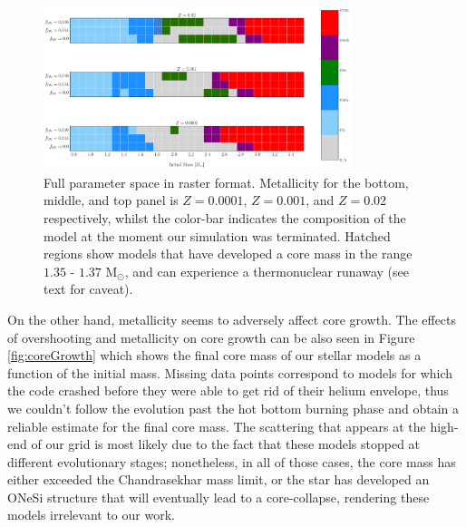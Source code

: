 \documentclass[../../main/thesis_msc.tex]{subfiles}
\begin{document}
    
   \begin{figure}[ht]
        \centering
        \includegraphics[width=0.8\textwidth]{../figures/chapter4/parameterSpaceRaster.png}
        \caption{Full parameter space in raster format. Metallicity for the bottom, middle, and top panel is $Z=0.0001$, $Z=0.001$, and $Z=0.02$ respectively, whilst the color-bar indicates the composition of the model at the moment our simulation was terminated. Hatched regions show models that have developed a core mass in the range $1.35$ - $1.37$ M$_{\odot}$, and can experience a thermonuclear runaway (see text for caveat).}
        \label{fig:parameterSpace}
    \end{figure}
    
    On the other hand, metallicity seems to adversely affect core growth. The effects of overshooting and metallicity on core growth can be also seen in Figure\, \ref{fig:coreGrowth} which shows the final core mass of our stellar models as a function of the initial mass. Missing data points correspond to models for which the code crashed before they were able to get rid of their helium envelope, thus we couldn't follow the evolution past the hot bottom burning phase and obtain a reliable estimate for the final core mass. The scattering that appears at the high-end of our grid is most likely due to the fact that these models stopped at different evolutionary stages; nonetheless, in all of those cases, the core mass has either exceeded the Chandrasekhar mass limit, or the star has developed an ONeSi structure that will eventually lead to a core-collapse, rendering these models irrelevant to our work.
    
\end{document}
